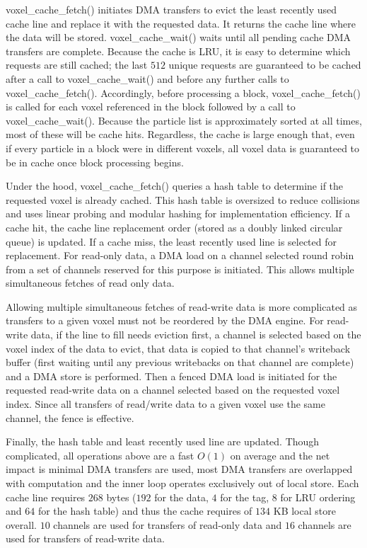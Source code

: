 \documentclass[letter,10pt]{article}
\begin{document}
voxel\_cache\_fetch() initiates DMA transfers to evict the least
recently used cache line and replace it with the requested data.  It
returns the cache line where the data will be stored.
voxel\_cache\_wait() waits until all pending cache DMA transfers are
complete.  Because the cache is LRU, it is easy to determine which
requests are still cached; the last $512$ unique requests are
guaranteed to be cached after a call to voxel\_cache\_wait() and
before any further calls to voxel\_cache\_fetch().  Accordingly,
before processing a block, voxel\_cache\_fetch() is called for each
voxel referenced in the block followed by a call to
voxel\_cache\_wait().  Because the particle list is approximately
sorted at all times, most of these will be cache hits.  Regardless,
the cache is large enough that, even if every particle in a block were
in different voxels, all voxel data is guaranteed to be in cache once
block processing begins.

Under the hood, voxel\_cache\_fetch() queries a hash table to
determine if the requested voxel is already cached.  This hash table
is oversized to reduce collisions and uses linear probing and modular
hashing for implementation efficiency.  If a cache hit, the cache line
replacement order (stored as a doubly linked circular queue) is
updated.  If a cache miss, the least recently used line is selected
for replacement.  For read-only data, a DMA load on a channel selected
round robin from a set of channels reserved for this purpose is
initiated.  This allows multiple simultaneous fetches of read only
data.

Allowing multiple simultaneous fetches of read-write data is more
complicated as transfers to a given voxel must not be reordered by the
DMA engine.  For read-write data, if the line to fill needs
eviction first, a channel is selected based on the voxel index of the data
to evict, that data is copied to that channel's writeback buffer
(first waiting until any previous writebacks on that channel are
complete) and a DMA store is performed.  Then a fenced DMA load is
initiated for the requested read-write data on a channel selected
based on the requested voxel index.  Since all transfers of read/write
data to a given voxel use the same channel, the fence is effective.

Finally, the hash table and least recently used line are updated.
Though complicated, all operations above are a fast $O(1)$ on average
and the net impact is minimal DMA transfers are used, most DMA
transfers are overlapped with computation and the inner loop operates
exclusively out of local store.  Each cache line requires $268$ bytes
($192$ for the data, $4$ for the tag, $8$ for LRU ordering and $64$
for the hash table) and thus the cache requires of $134$ KB local
store overall.  $10$ channels are used for transfers of read-only data
and $16$ channels are used for transfers of read-write data.
\end{document}
